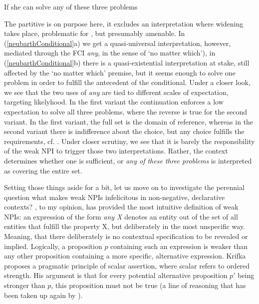 \documentclass[output=paper,colorlinks,citecolor=brown,
]{langscibook}
\begin{document}
  \begin{exe}
    \ex\label{neubarthConditional} If she can solve any of these three problems
    \begin{xlist}
    \end{xlist}
  \end{exe}

The partitive is on purpose here, it excludes an interpretation where widening takes place, problematic for
\citet{kadmonlandmann1993}, but presumably amenable. In (\ref{neubarthConditional}a) we get a quasi-universal interpretation,
however, mediated through the FCI \textit{any}, in the sense of `no matter which'), in (\ref{neubarthConditional}b) there is a
quasi-existential interpretation at stake, still affected by the `no matter which' premise, but it seems enough to
solve one problem in order to fulfill the antecedent of the conditional. Under a closer look, we see that the two uses
of {\em any} are tied to different scales of expectation, targeting likelyhood. In the first variant the continuation
enforces a low expectation to solve all three problems, where the reverse is true for the second variant. In the first
variant, the full set is the domain of reference, whereas in the second variant there is indifference about the choice,
but any choice fulfills the requirements, cf. \citet{dayal2004}. Under closer scrutiny, we see that it is barely the
responsibility of the weak NPI to trigger those two interpretations. Rather, the context determines whether one is
sufficient, or \textit{any of these three problems} is interpreted as covering the entire set.

Setting those things aside for a bit, let us move on to investigate the perennial question what makes weak NPIs infelicitous in
non-negative, declarative contexts? \citet{krifka1995}, to my opinion, has provided the most intuitive definition of weak NPIs:
an expression of the form {\em any X} denotes an entity out of the set of all entities that fulfill the property X, but
deliberately in the most unspecific way. Meaning, that there deliberately is no contextual specification to be revealed
or implied. Logically, a proposition $p$ containing such an expression is weaker than any other proposition containing
a more specific, alternative expression. Krifka proposes a pragmatic principle of scalar assertion, where scalar
refers to ordered strength. His argument is that for every potential alternative proposition $p'$ being stronger than
$p$, this proposition must not be true (a line of reasoning that has been taken up again by \citealt{chierchia2004}).
\end{document}
